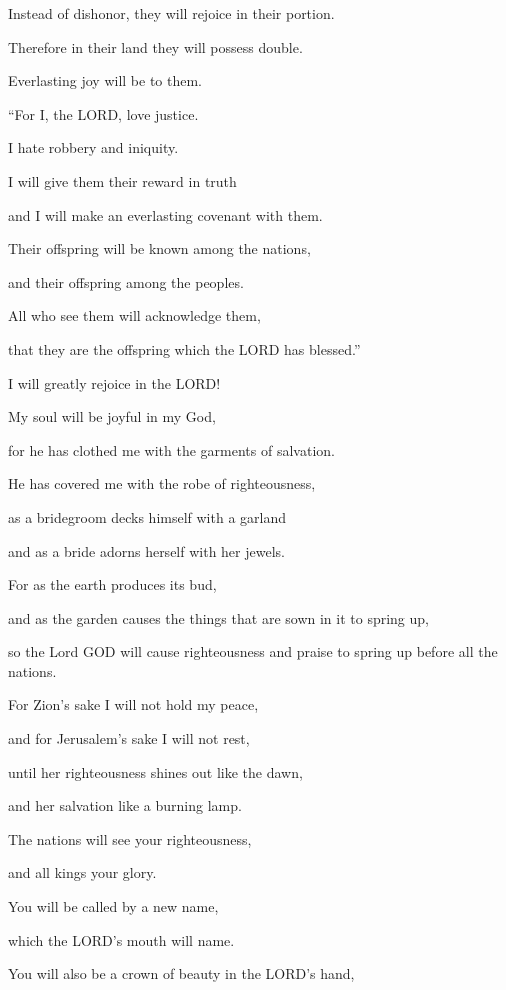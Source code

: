 Instead of dishonor, they will rejoice in their portion.

Therefore in their land they will possess double.

Everlasting joy will be to them.

\myverse{}“For I, the LORD, love justice.

I hate robbery and iniquity.

I will give them their reward in truth

and I will make an everlasting covenant with them.

\myverse{}Their offspring will be known among the nations,

and their offspring among the peoples.

All who see them will acknowledge them,

that they are the offspring which the LORD has blessed.”


\vspace{\baselineskip} \myverse{}I will greatly rejoice in the LORD!

My soul will be joyful in my God,

for he has clothed me with the garments of salvation.

He has covered me with the robe of righteousness,

as a bridegroom decks himself with a garland

and as a bride adorns herself with her jewels.

\myverse{}For as the earth produces its bud,

and as the garden causes the things that are sown in it to spring up,

so the Lord GOD will cause righteousness and praise to spring up before all the
nations.


\mychapter{} \myverse*{}For Zion’s sake I will not hold my peace,

\quad\quad and for Jerusalem’s sake I will not rest,

until her righteousness shines out like the dawn,

and her salvation like a burning lamp.

\myverse{}The nations will see your righteousness,

and all kings your glory.

You will be called by a new name,

which the LORD’s mouth will name.

\myverse{}You will also be a crown of beauty in the LORD’s hand,

